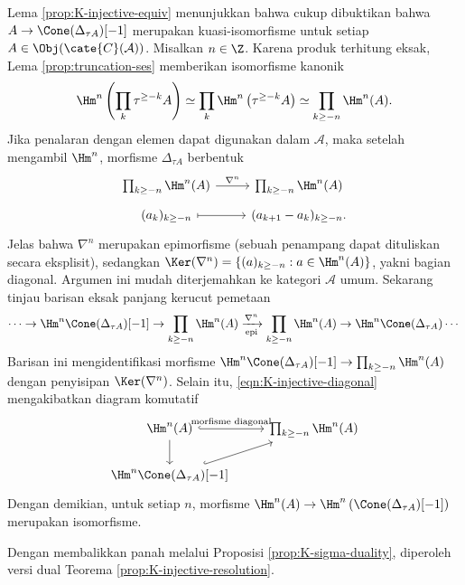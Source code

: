 \begin{bukti}
	Lema \ref{prop:K-injective-equiv} menunjukkan bahwa cukup dibuktikan bahwa
	$A\to\Cone(\Delta_{\tau A})[-1]$ merupakan kuasi-isomorfisme untuk
	setiap $A\in\Obj(\cate{C}(\mathcal{A}))$. Misalkan $n\in\Z$. Karena
	produk terhitung eksak, Lema \ref{prop:truncation-ses} memberikan
	isomorfisme kanonik
	\[
	\Hm^n\left( \prod_k \tau^{\geq -k} A \right)
	\simeq \prod_k \Hm^n\left( \tau^{\geq -k} A \right)
	\simeq \prod_{k \geq -n} \Hm^n(A).
	\]
	Jika penalaran dengan elemen dapat digunakan dalam $\mathcal{A}$, maka setelah
	mengambil $\Hm^n$, morfisme $\Delta_{\tau A}$ berbentuk
	\[\begin{tikzcd}[row sep=tiny]
		\prod_{k \geq -n} \Hm^n(A) \arrow[r, "\nabla^n"] &
		\prod_{k \geq -n} \Hm^n(A) \\
		(a_k)_{k \geq -n} \arrow[mapsto, r] &
		(a_{k+1} - a_k)_{k \geq -n}.
	\end{tikzcd}\]
	Jelas bahwa $\nabla^n$ merupakan epimorfisme (sebuah penampang dapat
	dituliskan secara eksplisit), sedangkan
	$\Ker(\nabla^n)=\left\{(a)_{k\geq-n}:a\in\Hm^n(A)\right\}$, yakni bagian
	diagonal. Argumen ini mudah diterjemahkan ke kategori $\mathcal{A}$
	umum. Sekarang tinjau barisan eksak panjang kerucut pemetaan
	\[
	\cdots \to \Hm^n \Cone(\Delta_{\tau A})[-1]
	\to \prod_{k \geq -n} \Hm^n(A)
	\xrightarrow[\text{epi}]{\nabla^n}
	\prod_{k \geq -n} \Hm^n(A)
	\to \Hm^n \Cone(\Delta_{\tau A}) \cdots
	\]
	Barisan ini mengidentifikasi morfisme
	$\Hm^n\Cone(\Delta_{\tau A})[-1]\to\prod_{k\geq-n}\Hm^n(A)$ dengan
	penyisipan $\Ker(\nabla^n)$. Selain itu,
	\eqref{eqn:K-injective-diagonal} mengakibatkan diagram komutatif
	\[\begin{tikzcd}
		\Hm^n(A) \arrow[d]
		\arrow[hookrightarrow, r, "\text{morfisme diagonal}"] &
		\prod_{k \geq -n} \Hm^n(A) \\
		\Hm^n {\Cone(\Delta_{\tau A})[-1]} \arrow[hookrightarrow, ru] &
	\end{tikzcd}\]
	Dengan demikian, untuk setiap $n$, morfisme
	$\Hm^n(A)\to\Hm^n\left(\Cone(\Delta_{\tau A})[-1]\right)$ merupakan
	isomorfisme.
\end{bukti}

Dengan membalikkan panah melalui Proposisi
\ref{prop:K-sigma-duality}, diperoleh versi dual Teorema
\ref{prop:K-injective-resolution}.

